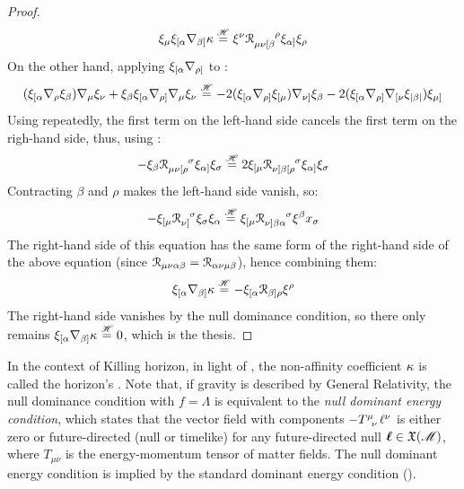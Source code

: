\begin{proofbox}
\begin{proof}
    \begin{equation*}
      \xi_\mu \xi_{[\alpha} \na_{\beta]} \sg \heq \xi^\nu \tensor{\rr}{_{\mu \nu [\beta}^\rho} \xi_{\alpha]} \xi_\rho
    \end{equation*}
    On the other hand, applying $ \xi_{[\alpha} \nabla_{\rho]} $ to :
    \begin{equation*}
      (\xi_{[\alpha} \nabla_\rho \xi_\beta) \nabla_\mu \xi_\nu + \xi_\beta \xi_{[\alpha} \nabla_{\rho]} \nabla_\mu \xi_\nu \overset{\mathscr{H}}{=} -2 (\xi_{[\alpha} \nabla_{\rho]} \xi_{[\mu}) \nabla_{\nu]} \xi_\beta - 2 (\xi_{[\alpha} \nabla_{\rho]} \nabla_{[\nu} \xi_{|\beta|}) \xi_{\mu]}
    \end{equation*}
    Using  repeatedly, the first term on the left-hand side cancels the first term on the righ-hand side, thus, using :
    \begin{equation*}
      - \xi_\beta \tensor{\rr}{_{\mu \nu [\rho}^\sigma} \xi_{\alpha]} \xi_\sigma \heq 2 \xi_{[\mu} \tensor{\rr}{_{\nu] \beta [\rho}^\sigma} \xi_{\alpha]} \xi_\sigma
    \end{equation*}
    Contracting $ \beta $ and $ \rho $ makes the left-hand side vanish, so:
    \begin{equation*}
      - \xi_{[\mu} \tensor{\rr}{_{\nu]}^\sigma} \xi_\sigma \xi_\alpha \heq \xi_{[\mu} \tensor{\rr}{_{\nu]\beta \alpha}^\sigma} \xi^\beta x_\sigma
    \end{equation*}
    The right-hand side of this equation has the same form of the right-hand side of the above equation (since $ \EuScript{R}_{\mu \nu \alpha \beta} = \EuScript{R}_{\alpha \nu \mu \beta} $), hence combining them:
    \begin{equation}
      \xi_{[\alpha} \nabla_{\beta]} \kappa \overset{\mathscr{H}}{=} - \xi_{[\alpha} \EuScript{R}_{\beta] \rho} \xi^\rho
    \end{equation}
    The right-hand side vanishes by the null dominance condition, so there only remains $ \xi_{[\alpha} \nabla_{\beta]} \kappa \overset{\mathscr{H}}{=} 0 $, which is the thesis.
  \end{proof}
\end{proofbox}

In the context of Killing horizon, in light of , the non-affinity coefficient $ \kappa $ is called the horizon's . Note that, if gravity is described by General Relativity, the null dominance condition with $ f = \Lambda $ is equivalent to the \emph{null dominant energy condition}, which states that the vector field with components $ - \tensor{T}{^\mu_\nu} \ell^\nu $ is either zero or future-directed (null or timelike) for any future-directed null $ \boldsymbol{\ell} \in \mathfrak{X}(\mathscr{M}) $, where $ T_{\mu \nu} $ is the energy-momentum tensor of matter fields. The null dominant energy condition is implied by the standard dominant energy condition ().

